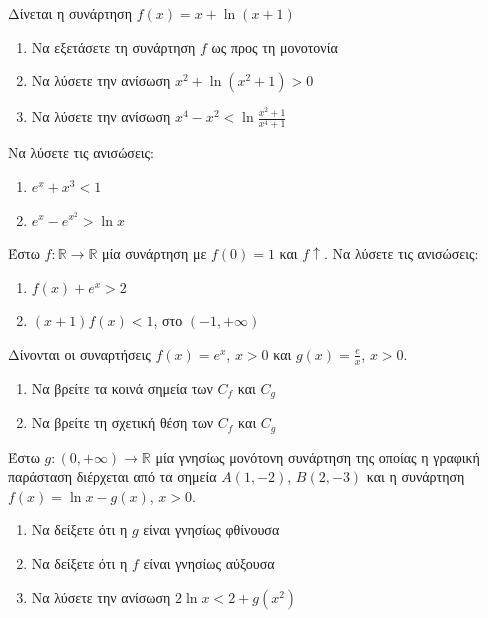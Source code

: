 \documentclass{presentation}
\begin{document}
\begin{askisi}
  Δίνεται η συνάρτηση $f(x)=x+\ln (x+1)$
  \begin{enumerate}
    \item Να εξετάσετε τη συνάρτηση $f$ ως προς τη μονοτονία \pause
    \item Να λύσετε την ανίσωση $x^2+\ln (x^2+1)>0$ \pause
    \item Να λύσετε την ανίσωση $x^4-x^2<\ln \frac{x^2+1}{x^4+1}$
  \end{enumerate}
\end{askisi}

\begin{askisi}
  Να λύσετε τις ανισώσεις:
  \begin{enumerate}
    \item $e^x+x^3<1$ \pause
    \item $e^x-e^{x^2}>\ln x$
  \end{enumerate}
\end{askisi}

\begin{askisi}
  Έστω $f:\mathbb{R}\to\mathbb{R}$ μία συνάρτηση με $f(0)=1$ και $f\uparrow$. Να λύσετε τις ανισώσεις:
  \begin{enumerate}
    \item $f(x)+e^x>2$ \pause
    \item $(x+1)f(x)<1$, στο $(-1,+\infty)$
  \end{enumerate}
\end{askisi}

\begin{askisi}
  Δίνονται οι συναρτήσεις $f(x)=e^x$, $x>0$ και $g(x)=\frac{e}{x}$, $x>0$.
  \begin{enumerate}
    \item Να βρείτε τα κοινά σημεία των $C_f$ και $C_g$ \pause
    \item Να βρείτε τη σχετική θέση των $C_f$ και $C_g$
  \end{enumerate}
\end{askisi}

\begin{askisi}
  Έστω $g:(0,+\infty)\to\mathbb{R}$ μία γνησίως μονότονη συνάρτηση της οποίας η γραφική παράσταση διέρχεται από τα σημεία $Α(1,-2)$, $Β(2,-3)$ και η συνάρτηση $f(x)=\ln x-g(x)$, $x>0$.
  \begin{enumerate}
    \item Να δείξετε ότι η $g$ είναι γνησίως φθίνουσα \pause
    \item Να δείξετε ότι η $f$ είναι γνησίως αύξουσα \pause
    \item Να λύσετε την ανίσωση $2\ln x<2+g(x^2)$
  \end{enumerate}
\end{askisi}
\end{document}
